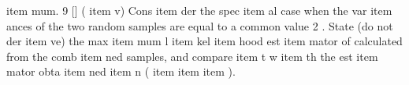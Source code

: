item mum.
9
[]
(%
item v) Cons%
item der the spec%
item al case when the var%
item ances of the two random samples are
equal to a common value 2 . State (do not der%
item ve) the max%
item mum l%
item kel%
item hood
est%
item mator of calculated from the comb%
item ned samples, and compare %
item t w%
item th the
est%
item mator obta%
item ned %
item n (%
item %
item %
item ).

